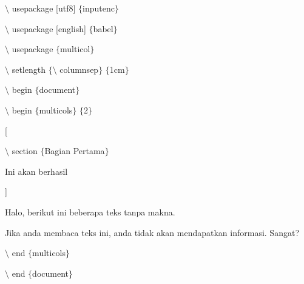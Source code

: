 \begin{itemize}
\hspace*{0.5in}$\setminus$ usepackage [utf8] $ \{ $inputenc$ \} $\par

\hspace*{0.5in}$\setminus$ usepackage [english] $ \{ $babel$ \} $\par

\hspace*{0.5in}$\setminus$ usepackage $ \{ $multicol$ \} $\par

\hspace*{0.5in}$\setminus$ setlength $ \{ $$\setminus$ columnsep$ \} $ $ \{ $1cm$ \} $\par

\hspace*{0.5in}$\setminus$ begin $ \{ $document$ \} $\par

\hspace*{0.5in}$\setminus$ begin $ \{ $multicols$ \} $ $ \{ $2$ \} $\par

\hspace*{0.5in}[\par
\vspace{\baselineskip}
\hspace*{0.5in}\hspace*{0.5in}$\setminus$ section $ \{ $Bagian Pertama$ \} $\par

\hspace*{0.5in}\hspace*{0.5in}Ini akan berhasil \par

\hspace*{0.5in}]\par
\vspace{\baselineskip}
\hspace*{0.5in}\hspace*{0.5in}Halo, berikut ini beberapa teks tanpa makna. \par
\vspace{\baselineskip}
Jika anda membaca teks ini, anda tidak akan mendapatkan informasi. Sangat?\par

\hspace*{0.5in}$\setminus$ end $ \{ $multicols$ \} $\par

\hspace*{0.5in}$\setminus$ end $ \{ $document$ \} $\par


\end{itemize}
